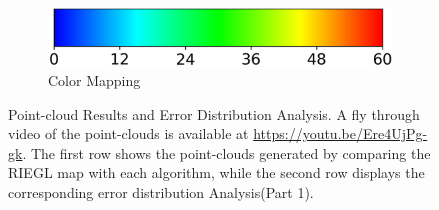 \documentclass[english, bachelor, utf8]{base/thesis_telematics}
\begin{document}
\begin{figure}
\begin{subfigure}{0.3\textwidth}
    \centering
    \includegraphics[width=\textwidth]{pics/histogram_results/hsv.png}
    \caption{Color Mapping}
    \label{fig:hsv}
\end{subfigure}
\caption{Point-cloud Results and Error Distribution Analysis. A fly through video of the point-clouds is available at \url{https://youtu.be/Ere4UjPg-gk}. 
The first row shows the point-clouds generated by comparing the RIEGL map with each algorithm, while the second row displays the corresponding error distribution Analysis(Part 1).}
\label{fig:combined_results1}
\end{figure}
\end{document}
